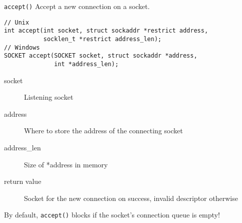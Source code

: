 \begin{frame}[fragile]{\texttt{accept()}}
    Accept a new connection on a socket.
    \begin{lstlisting}[numbers=none,morekeywords={*,SOCKET,sockaddr,socklen_t}]
// Unix
int accept(int socket, struct sockaddr *restrict address,
           socklen_t *restrict address_len);
// Windows
SOCKET accept(SOCKET socket, struct sockaddr *address,
              int *address_len);
\end{lstlisting}
    \begin{description}
        \item[socket] Listening socket
        \item[address] Where to store the address of the
            connecting socket
        \item[address\_len] Size of *address in memory
        \item[return value] Socket for the new connection on success, invalid
            descriptor otherwise
    \end{description}
    \bigskip
    By default, \texttt{accept()} blocks if the socket's connection queue is empty!
\end{frame}



